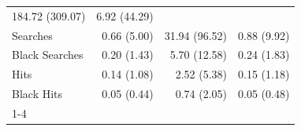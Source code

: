 \begin{table}[!h]
\begin{tabular}{llll}
  \multicolumn{1}{r}{184.72 (309.07)} &
  \multicolumn{1}{r}{6.92 (44.29)} \\
\multicolumn{1}{l}{\hspace{1em}Searches} &
  \multicolumn{1}{r}{0.66 (5.00)} &
  \multicolumn{1}{r}{31.94 (96.52)} &
  \multicolumn{1}{r}{0.88 (9.92)} \\
\multicolumn{1}{l}{\hspace{1em}Black Searches} &
  \multicolumn{1}{r}{0.20 (1.43)} &
  \multicolumn{1}{r}{5.70 (12.58)} &
  \multicolumn{1}{r}{0.24 (1.83)} \\
\multicolumn{1}{l}{\hspace{1em}Hits} &
  \multicolumn{1}{r}{0.14 (1.08)} &
  \multicolumn{1}{r}{2.52 (5.38)} &
  \multicolumn{1}{r}{0.15 (1.18)} \\
\multicolumn{1}{l}{\hspace{1em}Black Hits} &
  \multicolumn{1}{r}{0.05 (0.44)} &
  \multicolumn{1}{r}{0.74 (2.05)} &
  \multicolumn{1}{r}{0.05 (0.48)} \\
\cline{1-4}
\end{tabular}
\end{table}
